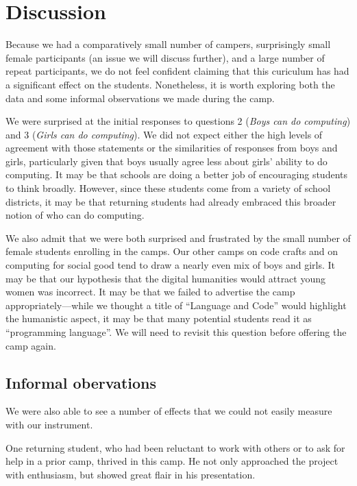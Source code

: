 \section{Discussion}

Because we had a comparatively small number of campers, surprisingly
small female participants (an issue we will discuss further), and
a large number of repeat participants, we do not feel confident
claiming that this curiculum has had a significant effect on the
students.  Nonetheless, it is worth exploring both the data and
some informal observations we made during the camp.

We were surprised at the initial responses to questions 2 (\textit{Boys
can do computing}) and 3 (\textit{Girls can do computing}).  We did
not expect either the high levels of agreement with those statements
or the similarities of responses from boys and girls, particularly
given that boys usually agree less about girls' ability to do
computing.  It may be that schools are doing a better job of
encouraging students to think broadly.  However, since these students
come from a variety of school districts, it may be that returning
students had already embraced this broader notion of who can do
computing.

We also admit that we were both surprised and frustrated by the
small number of female students enrolling in the camps.  Our other
camps on code crafts and on computing for social good tend to draw
a nearly even mix of boys and girls.  It may be that our hypothesis
that the digital humanities would attract young women was incorrect.
It may be that we failed to advertise the camp appropriately---while
we thought a title of ``Language and Code'' would highlight the
humanistic aspect, it may be that many potential students read it
as ``programming language''.  We will need to revisit this question
before offering the camp again.

\subsection{Informal obervations}

We were also able to see a number of effects that we could
not easily measure with our instrument.

One returning student, who had been reluctant to work with others
or to ask for help in a prior camp, thrived in this camp.  He not
only approached the project with enthusiasm, but showed great
flair in his presentation.

